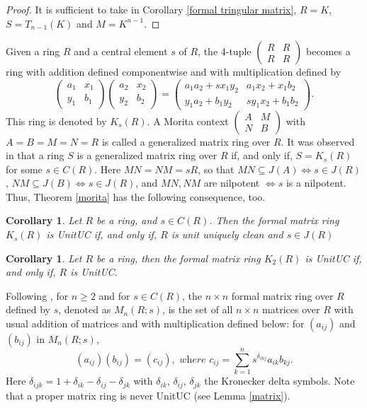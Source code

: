\documentclass[12pt]{amsart}
\newtheorem{corollary}[theorem]{Corollary}
\theoremstyle{definition}
\begin{document}
\begin{proof}
It is sufficient to take in Corollary \ref{formal tringular matrix}, $R=K$, $S=T_{n-1}(K)$ and $M=K^{n-1}$.
\end{proof}


Given a ring $R$ and a central element $s$ of $R$, the 4-tuple 
$\begin{pmatrix}
 R& R \\
 R& R
\end{pmatrix}$
becomes a ring with addition defined componentwise and with multiplication defined by
$$
\begin{pmatrix}
 a_1& x_1 \\
 y_1& b_1
\end{pmatrix}
\begin{pmatrix}
  a_2& x_2 \\
 y_2& b_2
\end{pmatrix}=
\begin{pmatrix}
 a_1a_2 + sx_1y_2& a_1x_2 + x_1b_2 \\
 y_1a_2 + b_1y_2& sy_1x_2 + b_1b_2
\end{pmatrix}.
$$
This ring is denoted by $K_s(R)$. A Morita context
$
\begin{pmatrix}
  A& M \\
 N& B
\end{pmatrix}
$
with $A = B = M = N = R$ is called a generalized matrix ring over $R$. It was observed in \cite{krylov2008isomorphism} that a ring $S$ is a generalized matrix ring over $R$ if, and only if, $S = K_s(R)$ for some $s \in C(R)$. Here $MN = NM = sR$, so that $MN \subseteq J(A) \Longleftrightarrow  s \in J(R)$, $NM \subseteq J(B) \Longleftrightarrow  s \in  J(R)$, and $MN, NM$ are nilpotent $\Longleftrightarrow  s$ is a nilpotent. Thus, Theorem \ref{morita} has the following consequence, too.


\begin{corollary} \label{formal Ks(R)}
Let $R$ be a ring, and $s \in C(R)$. Then the formal matrix ring $K_s(R)$ is   UnitUC if, and only if, $R$ is unit uniquely clean and $s \in J(R)$
\end{corollary}


\begin{corollary}
Let $R$ be a ring, then the formal matrix ring $K_2(R)$ is   UnitUC if, and only if, $R$ is   UnitUC.
\end{corollary}


Following \cite{zhou3}, for $n \ge 2$ and for $s \in C(R)$, the $n \times n$ formal matrix ring over $R$ defined by $s$, denoted as $M_n(R; s)$, is the set of all $n \times n$ matrices over $R$ with usual addition of matrices and with multiplication defined below: for $(a_{ij})$ and $(b_{ij})$ in $M_n(R;s)$,
$$(a_{ij} )(b_{ij} )=(c_{ij} ), \textit{ where } c_{ij} = \sum_{k=1}^{n}s^{\delta_{ikj}} a_{ik}b_{kj}.$$
Here $\delta_{ijk} = 1 + \delta_{ik} - \delta_{ij} - \delta_{jk}$ with $\delta_{ik}$, $\delta_{ij}$, $\delta_{jk}$ the Kronecker delta symbols. Note that a proper matrix ring is never   UnitUC (see Lemma \ref{matrix}).
\end{document}
